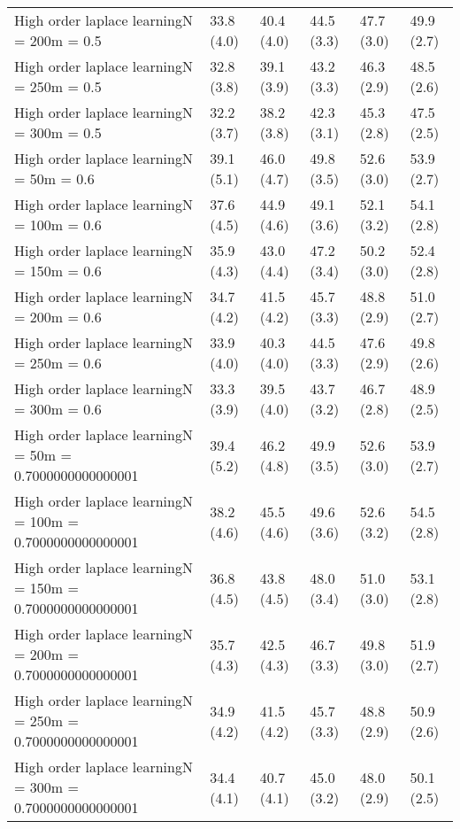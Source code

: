 \documentclass{article}
\begin{document}
\begin{table*}[t!]
\begin{center}
\begin{small}
\begin{sc}
\begin{tabular}{llllll}
High order laplace learningN = 200m = 0.5&33.8 (4.0)      &40.4 (4.0)      &44.5 (3.3)      &47.7 (3.0)      &49.9 (2.7)      \\
High order laplace learningN = 250m = 0.5&32.8 (3.8)      &39.1 (3.9)      &43.2 (3.3)      &46.3 (2.9)      &48.5 (2.6)      \\
High order laplace learningN = 300m = 0.5&32.2 (3.7)      &38.2 (3.8)      &42.3 (3.1)      &45.3 (2.8)      &47.5 (2.5)      \\
High order laplace learningN = 50m = 0.6&39.1 (5.1)      &46.0 (4.7)      &49.8 (3.5)      &52.6 (3.0)      &53.9 (2.7)      \\
High order laplace learningN = 100m = 0.6&37.6 (4.5)      &44.9 (4.6)      &49.1 (3.6)      &52.1 (3.2)      &54.1 (2.8)      \\
High order laplace learningN = 150m = 0.6&35.9 (4.3)      &43.0 (4.4)      &47.2 (3.4)      &50.2 (3.0)      &52.4 (2.8)      \\
High order laplace learningN = 200m = 0.6&34.7 (4.2)      &41.5 (4.2)      &45.7 (3.3)      &48.8 (2.9)      &51.0 (2.7)      \\
High order laplace learningN = 250m = 0.6&33.9 (4.0)      &40.3 (4.0)      &44.5 (3.3)      &47.6 (2.9)      &49.8 (2.6)      \\
High order laplace learningN = 300m = 0.6&33.3 (3.9)      &39.5 (4.0)      &43.7 (3.2)      &46.7 (2.8)      &48.9 (2.5)      \\
High order laplace learningN = 50m = 0.7000000000000001&39.4 (5.2)      &46.2 (4.8)      &49.9 (3.5)      &52.6 (3.0)      &53.9 (2.7)      \\
High order laplace learningN = 100m = 0.7000000000000001&38.2 (4.6)      &45.5 (4.6)      &49.6 (3.6)      &52.6 (3.2)      &54.5 (2.8)      \\
High order laplace learningN = 150m = 0.7000000000000001&36.8 (4.5)      &43.8 (4.5)      &48.0 (3.4)      &51.0 (3.0)      &53.1 (2.8)      \\
High order laplace learningN = 200m = 0.7000000000000001&35.7 (4.3)      &42.5 (4.3)      &46.7 (3.3)      &49.8 (3.0)      &51.9 (2.7)      \\
High order laplace learningN = 250m = 0.7000000000000001&34.9 (4.2)      &41.5 (4.2)      &45.7 (3.3)      &48.8 (2.9)      &50.9 (2.6)      \\
High order laplace learningN = 300m = 0.7000000000000001&34.4 (4.1)      &40.7 (4.1)      &45.0 (3.2)      &48.0 (2.9)      &50.1 (2.5)      \\

\end{tabular}
\end{sc}
\end{small}
\end{center}
\end{table*}
\end{document}
